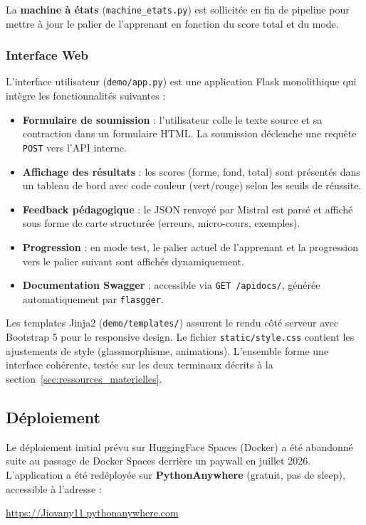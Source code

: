 La \textbf{machine à états} (\texttt{machine\_etats.py}) est sollicitée en fin de pipeline pour mettre à jour le palier de l'apprenant en fonction du score total et du mode.

\subsubsection{Interface Web}

L'interface utilisateur (\texttt{demo/app.py}) est une application Flask monolithique qui intègre les fonctionnalités suivantes :

\begin{itemize}
    \item \textbf{Formulaire de soumission} : l'utilisateur colle le texte source et sa contraction dans un formulaire HTML. La soumission déclenche une requête \texttt{POST} vers l'API interne.
    \item \textbf{Affichage des résultats} : les scores (forme, fond, total) sont présentés dans un tableau de bord avec code couleur (vert/rouge) selon les seuils de réussite.
    \item \textbf{Feedback pédagogique} : le JSON renvoyé par Mistral est parsé et affiché sous forme de carte structurée (erreurs, micro-cours, exemples).
    \item \textbf{Progression} : en mode test, le palier actuel de l'apprenant et la progression vers le palier suivant sont affichés dynamiquement.
    \item \textbf{Documentation Swagger} : accessible via \texttt{GET /apidocs/}, générée automatiquement par \texttt{flasgger}.
\end{itemize}

Les templates Jinja2 (\texttt{demo/templates/}) assurent le rendu côté serveur avec Bootstrap 5 pour le responsive design. Le fichier \texttt{static/style.css} contient les ajustements de style (glassmorphisme, animations). L'ensemble forme une interface cohérente, testée sur les deux terminaux décrits à la section~\ref{sec:ressources_materielles}.

\subsection{Déploiement}

Le déploiement initial prévu sur HuggingFace Spaces (Docker) a été abandonné suite au passage de Docker Spaces derrière un paywall en juillet 2026. L'application a été redéployée sur \textbf{PythonAnywhere} (gratuit, pas de sleep), accessible à l'adresse :
\begin{center}
\url{https://Jiovany11.pythonanywhere.com}
\end{center}

